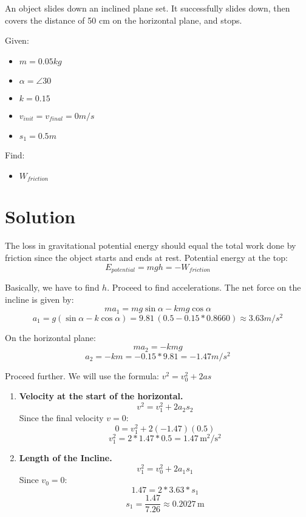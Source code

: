 An object slides down an inclined plane set. It successfully slides down, then covers the distance of 50 cm on the horizontal
plane, and stops.

\bigbreak Given:
\begin{itemize}
    \item $m = 0.05kg$
    \item $\alpha = \angle30$
    \item $ k=0.15 $
    \item $ v_{init} = v_{final} = 0m/s $
    \item $ s_1 = 0.5m $
\end{itemize}

\bigbreak Find:
\begin{itemize}
    \item $W_{friction} $
\end{itemize}

\section*{Solution}
The loss in gravitational potential energy should equal the total work done by friction since the object starts and ends at rest.
Potential energy at the top: 
\begin{equation}
    \label{eq:main}
    E_{potential} = mgh = -W_{friction}
\end{equation}

Basically, we have to find $h$. Proceed to find accelerations.
\smallbreak The net force on the incline is given by:
$$  ma_1 = mg \sin\alpha - kmg \cos\alpha $$ 
$$ a_1 = g(\sin\alpha - k \cos \alpha) = 9.81 \, (0.5 - 0.15 * 0.8660) \approx 3.63m/s^2 $$

\bigbreak On the horizontal plane: $$ ma_2 = -kmg $$
$$ a_2 = -km = -0.15 * 9.81 = -1.47m/s^2 $$

\bigbreak Proceed further. 
\smallbreak We will use the formula: $ v^2 = v_0^2 + 2 a s $

\begin{enumerate}
    \item \textbf{Velocity at the start of the horizontal.}
    $$ v^2 = v_1^2 + 2 a_2 s_2 $$
    Since the final velocity \( v = 0 \):
    $$ 0 = v_1^2 + 2 (-1.47)(0.5) $$ \smallbreak
    $$ v_1^2 = 2 * 1.47 * 0.5 = 1.47 \, \text{m}^2/\text{s}^2 $$

    \item \textbf{Length of the Incline.}
    \[
    v_1^2 = v_0^2 + 2 a_1 s_1
    \]
    Since \( v_0 = 0 \):
    $$ 1.47 = 2 * 3.63 * s_1 $$ 
    \smallbreak $$ s_1 = \frac{1.47}{7.26} \approx 0.2027 \, \text{m} $$ 
\end{enumerate}

